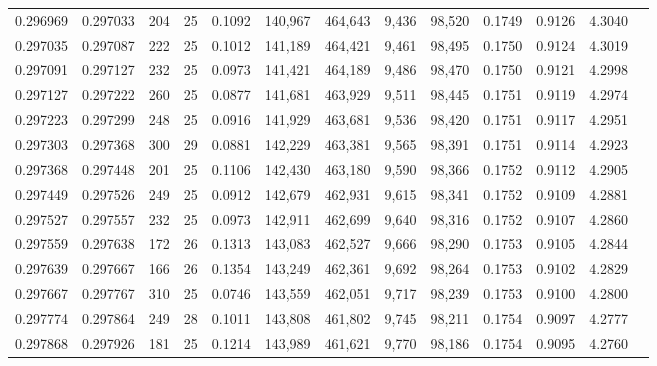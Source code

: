 \begin{tabular}{rrrrrrrrrrrrr}
0.296969 & 0.297033 &   204 &  25 &                                     0.1092 & 140,967 & 464,643 &   9,436 &  98,520 & 0.1749 & 0.9126 & 4.3040 \\
0.297035 & 0.297087 &   222 &  25 &                                     0.1012 & 141,189 & 464,421 &   9,461 &  98,495 & 0.1750 & 0.9124 & 4.3019 \\
0.297091 & 0.297127 &   232 &  25 &                                     0.0973 & 141,421 & 464,189 &   9,486 &  98,470 & 0.1750 & 0.9121 & 4.2998 \\
0.297127 & 0.297222 &   260 &  25 &                                     0.0877 & 141,681 & 463,929 &   9,511 &  98,445 & 0.1751 & 0.9119 & 4.2974 \\
0.297223 & 0.297299 &   248 &  25 &                                     0.0916 & 141,929 & 463,681 &   9,536 &  98,420 & 0.1751 & 0.9117 & 4.2951 \\
0.297303 & 0.297368 &   300 &  29 &                                     0.0881 & 142,229 & 463,381 &   9,565 &  98,391 & 0.1751 & 0.9114 & 4.2923 \\
0.297368 & 0.297448 &   201 &  25 &                                     0.1106 & 142,430 & 463,180 &   9,590 &  98,366 & 0.1752 & 0.9112 & 4.2905 \\
0.297449 & 0.297526 &   249 &  25 &                                     0.0912 & 142,679 & 462,931 &   9,615 &  98,341 & 0.1752 & 0.9109 & 4.2881 \\
0.297527 & 0.297557 &   232 &  25 &                                     0.0973 & 142,911 & 462,699 &   9,640 &  98,316 & 0.1752 & 0.9107 & 4.2860 \\
0.297559 & 0.297638 &   172 &  26 &                                     0.1313 & 143,083 & 462,527 &   9,666 &  98,290 & 0.1753 & 0.9105 & 4.2844 \\
0.297639 & 0.297667 &   166 &  26 &                                     0.1354 & 143,249 & 462,361 &   9,692 &  98,264 & 0.1753 & 0.9102 & 4.2829 \\
0.297667 & 0.297767 &   310 &  25 &                                     0.0746 & 143,559 & 462,051 &   9,717 &  98,239 & 0.1753 & 0.9100 & 4.2800 \\
0.297774 & 0.297864 &   249 &  28 &                                     0.1011 & 143,808 & 461,802 &   9,745 &  98,211 & 0.1754 & 0.9097 & 4.2777 \\
0.297868 & 0.297926 &   181 &  25 &                                     0.1214 & 143,989 & 461,621 &   9,770 &  98,186 & 0.1754 & 0.9095 & 4.2760 \\

\end{tabular}
